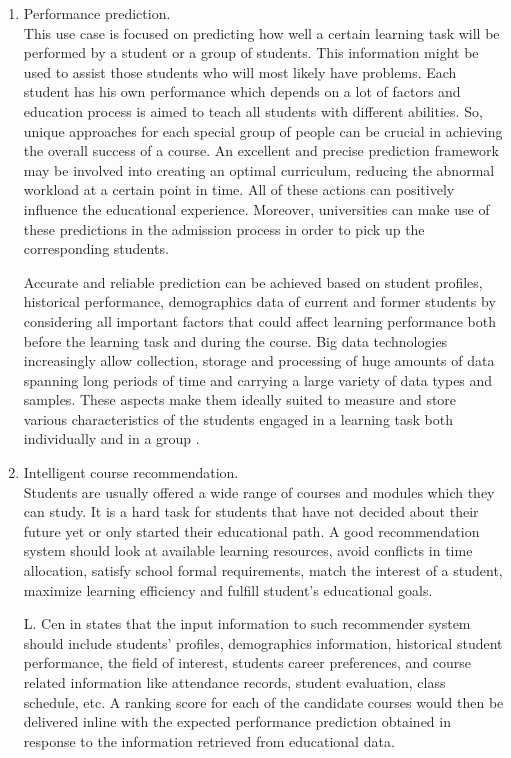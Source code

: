 \documentclass[runningheads]{llncs}
\begin{document}
\begin{enumerate}
\item Performance prediction.\\

This use case is focused on predicting how well a certain learning task will be performed by a student or a group of students. This information might be used to assist those students who will most likely have problems. Each student has his own performance which depends on a lot of factors and education process is aimed to teach all students with different abilities. So, unique approaches for each special group of people can be crucial in achieving the overall success of a course. An excellent and precise prediction framework may be involved into creating an optimal curriculum, reducing the abnormal workload at a certain point in time. All of these actions can positively influence the educational experience. Moreover, universities can make use of these predictions in the admission process in order to pick up the corresponding students.

Accurate and reliable prediction can be achieved based on student profiles, historical performance, demographics data of current and former students by considering all important factors that could affect learning performance both before the learning task and during the course. Big data technologies increasingly allow collection, storage and processing of huge amounts of data spanning long periods of time and carrying a large variety of data types and samples. These aspects make them ideally suited to measure and store various characteristics of the students engaged in a learning task both individually and in a group \cite{EDUCATIONOPPORTUNITIES}.\\

\item Intelligent course recommendation.\\

Students are usually offered a wide range of courses and modules which they can study. It is a hard task for students that have not decided about their future yet or only started their educational path. A good recommendation system should look at available learning resources, avoid conflicts in time allocation, satisfy school formal requirements, match the interest of a student, maximize learning efficiency and fulfill student's educational goals.

L. Cen in \cite{EDUCATIONOPPORTUNITIES} states that the input information to such recommender system should include students' profiles, demographics information, historical student performance, the field of interest, students career preferences, and course related information like attendance records, student evaluation,
class schedule, etc. A ranking score for each of the candidate courses would then be delivered inline with the expected performance prediction obtained in response to the information retrieved from educational data.\\


\end{enumerate}
\end{document}
